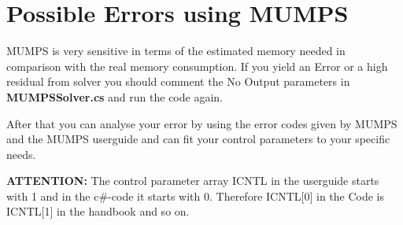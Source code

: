 \documentclass[11pt,twoside,a4paper]{fdyartcl}
\theoremstyle{myPlain}
\theoremstyle{myDefinition}
\begin{document}
\section{Possible Errors using MUMPS}
MUMPS is very sensitive in terms of the estimated memory needed in comparison with the real memory consumption. If you yield an Error or a high residual from solver you should comment the No Output parameters in \textbf{MUMPSSolver.cs} and run the code again. 

After that you can analyse your error by using the error codes given by MUMPS and the MUMPS userguide and can fit your control parameters to your specific needs.

 \textbf{ATTENTION:} The control parameter array ICNTL in the userguide starts with 1 and in the c\#-code it starts with 0. Therefore ICNTL[0] in the Code is ICNTL[1] in the handbook and so on. 
\end{document}

